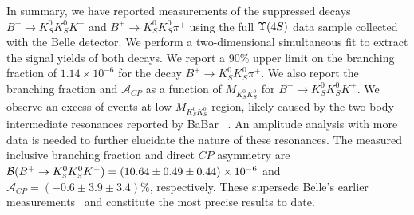 \documentclass[aps,prl,preprint,tightenlines,superscriptaddress,,amsmath,byrevtex]{revtex4}
\def\pip    {\ensuremath{\pi^+}\xspace}
\def\Kp     {\ensuremath{K^+}\xspace}
\def\KS     {\ensuremath{K^0_{\scriptscriptstyle S}}\xspace}
\def\Bu     {\ensuremath{B^+}\xspace}
\def\Bp     {\ensuremath{\Bu}\xspace}
\newcommand{\mkk}{\ensuremath{M_{K_{S}^{0}K_{S}^{0}}}\xspace}
\def\Y#1S{\ensuremath{\Upsilon{(#1S)}}\xspace}
\def\to{\ensuremath{\rightarrow}\xspace}
\def\CP {\ensuremath{C\!P}\xspace}
\def\ACP{{\ensuremath{\mathcal{A}_{\CP}}\xspace}}
\begin{document}
In summary, we have reported measurements of the suppressed decays $\Bp\to\KS\KS\Kp$ and $\Bp\to\KS\KS\pip$
using the full $\Y4S$ data sample collected with the Belle detector. We perform a two-dimensional simultaneous fit to extract the signal yields of both decays. We report a 90\% upper limit on the branching fraction of $1.14 \times10^{-6}$  for the decay $\Bp\to\KS\KS\pip$. We also report the branching fraction and $\ACP$ as a function of $\mkk$ for $\Bp\to\KS\KS\Kp$.  We observe an excess of events at low $\mkk$ region, likely caused by the two-body intermediate resonances reported by BaBar ~\cite{BaBar:paper1}. An amplitude analysis with more data is needed to further elucidate the nature of these resonances. The measured inclusive branching fraction and direct $\CP$ asymmetry are 
${\cal B}(\Bp\to\KS\KS\Kp) = (10.64\pm0.49\pm0.44)\times 10^{-6}$ and $\ACP = (-0.6\pm3.9\pm3.4)\%$, respectively. These supersede Belle's earlier measurements~\cite{Belle:paper1} and constitute the most precise results to date.
\ \\ 
\ \\
\ \\
\end{document}
